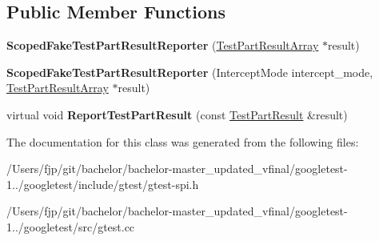 \subsection*{Public Member Functions}
\begin{DoxyCompactItemize}
\item 
\mbox{\label{classtesting_1_1_scoped_fake_test_part_result_reporter_aa0100ecf4799fb51d45167be6a5de1d5}} 
{\bfseries Scoped\+Fake\+Test\+Part\+Result\+Reporter} (\mbox{\hyperlink{classtesting_1_1_test_part_result_array}{Test\+Part\+Result\+Array}} $\ast$result)
\item 
\mbox{\label{classtesting_1_1_scoped_fake_test_part_result_reporter_a57cbc09ed48627c8a73e622618dc4b4f}} 
{\bfseries Scoped\+Fake\+Test\+Part\+Result\+Reporter} (Intercept\+Mode intercept\+\_\+mode, \mbox{\hyperlink{classtesting_1_1_test_part_result_array}{Test\+Part\+Result\+Array}} $\ast$result)
\item 
\mbox{\label{classtesting_1_1_scoped_fake_test_part_result_reporter_a82531434f51632d98ed7cdcdb10b8b92}} 
virtual void {\bfseries Report\+Test\+Part\+Result} (const \mbox{\hyperlink{classtesting_1_1_test_part_result}{Test\+Part\+Result}} \&result)
\end{DoxyCompactItemize}


The documentation for this class was generated from the following files\+:\begin{DoxyCompactItemize}
\item 
/\+Users/fjp/git/bachelor/bachelor-\/master\+\_\+updated\+\_\+vfinal/googletest-\/1../googletest/include/gtest/gtest-\/spi.\+h\item 
/\+Users/fjp/git/bachelor/bachelor-\/master\+\_\+updated\+\_\+vfinal/googletest-\/1../googletest/src/gtest.\+cc\end{DoxyCompactItemize}
